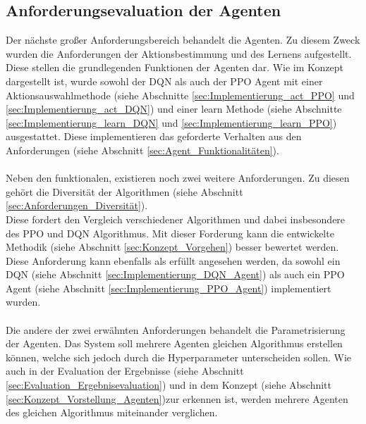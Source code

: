\subsection{Anforderungsevaluation der Agenten}
Der nächste großer Anforderungsbereich behandelt die Agenten. Zu diesem Zweck wurden die Anforderungen der Aktionsbestimmung und des Lernens aufgestellt. Diese stellen die grundlegenden Funktionen der Agenten dar. 
Wie im Konzept dargestellt ist, wurde sowohl der DQN als auch der PPO Agent mit einer Aktionsauswahlmethode (siehe Abschnitte \ref{sec:Implementierung_act_PPO} und \ref{sec:Implementierung_act_DQN}) und einer learn Methode (siehe Abschnitte \ref{sec:Implementierung_learn_DQN} und \ref{sec:Implementierung_learn_PPO}) ausgestattet. Diese implementieren das geforderte Verhalten aus den Anforderungen (siehe Abschnitt \ref{sec:Agent_Funktionalitäten}).\\
\\Neben den funktionalen, existieren noch zwei weitere Anforderungen. Zu diesen gehört die Diversität der Algorithmen (siehe Abschnitt \ref{sec:Anforderungen_Diversität}).\\
Diese fordert den Vergleich verschiedener Algorithmen und dabei insbesondere des PPO und DQN Algorithmus. Mit dieser Forderung kann die entwickelte Methodik (siehe Abschnitt \ref{sec:Konzept_Vorgehen}) besser bewertet werden. Diese Anforderung kann ebenfalls als erfüllt angesehen werden, da sowohl ein DQN (siehe Abschnitt \ref{sec:Implementierung_DQN_Agent}) als auch ein PPO Agent (siehe Abschnitt \ref{sec:Implementierung_PPO_Agent}) implementiert wurden.\\
\\ Die andere der zwei erwähnten Anforderungen behandelt die Parametrisierung der Agenten. Das System soll mehrere Agenten gleichen Algorithmus erstellen können, welche sich jedoch durch die Hyperparameter unterscheiden sollen. Wie auch in der Evaluation der Ergebnisse (siehe Abschnitt \ref{sec:Evaluation_Ergebnisevaluation}) und in dem Konzept (siehe Abschnitt \ref{sec:Konzept_Vorstellung_Agenten})zur erkennen ist, werden mehrere Agenten des gleichen Algorithmus miteinander verglichen.

